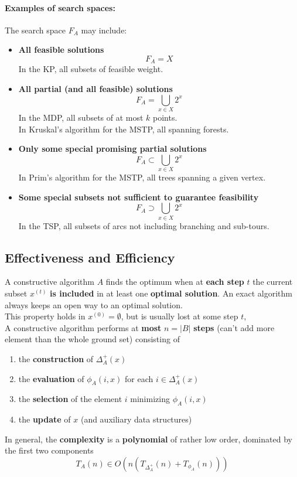 \paragraph{Examples of search spaces:} The search space $F_A$ may include:
\begin{itemize}
	\item \textbf{All feasible solutions}
	$$ F_A = X $$
	In the KP, all subsets of feasible weight.\\
	
	\item \textbf{All partial (and all feasible) solutions}
	$$ F_A = \bigcup_{x \in X} 2^x $$
	In the MDP, all subsets of at most $k$ points.\\
	In Kruskal's algorithm for the MSTP, all spanning forests.\\
	
	\item \textbf{Only some special promising partial solutions}
	$$ F_A \subset \bigcup_{x \in X} 2^x $$
	In Prim's algorithm for the MSTP, all trees spanning a given vertex.\\
	
	\item \textbf{Some special subsets not sufficient to guarantee feasibility}
	$$ F_A \supset \bigcup_{x \in X} 2^x $$
	In the TSP, all subsets of arcs not including branching and sub-tours.\\
\end{itemize}

\newpage

\subsection{Effectiveness and Efficiency}
A constructive algorithm $A$ finds the optimum when at \textbf{each step} $t$ the current subset $x^{(t)}$ \textbf{is included} in at least one \textbf{optimal solution}. An exact algorithm always keeps an open way to an optimal solution.\\
This property holds in $x^{(0)} = \emptyset$, but is usually lost at some step $t$,\\

A constructive algorithm performs at \textbf{most} $n = |B|$ \textbf{steps} (can't add more element than the whole ground set) consisting of 
\begin{enumerate}
	\item the \textbf{construction} of $\Delta_A^+ (x)$
	\item the \textbf{evaluation} of $\phi_A (i,x)$ for each $i \in \Delta_A^+(x)$
	\item the \textbf{selection} of the element $i$ minimizing $\phi_A (i,x)$
	\item the \textbf{update} of $x$ (and auxiliary data structures)
\end{enumerate}
In general, the \textbf{complexity} is a \textbf{polynomial} of rather low order, dominated by the first two components
$$ T_A (n) \in O\left(n \left(T_{\Delta_A^+} (n) + T_{\phi_A} (n)\right)\right) $$

